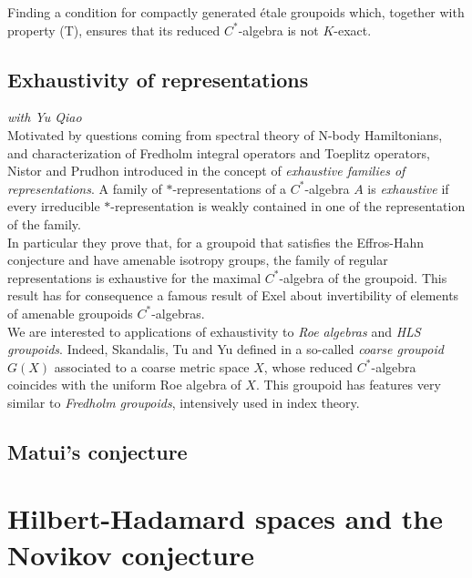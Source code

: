 \begin{project}
Finding a condition for compactly generated \'etale groupoids which, together with property (T), ensures that its reduced $C^*$-algebra is not $K$-exact. 
\end{project}

\subsection*{Exhaustivity of representations}

\textit{with Yu Qiao}\\

Motivated by questions coming from spectral theory of N-body Hamiltonians, and characterization of Fredholm integral operators and Toeplitz operators, Nistor and Prudhon introduced in \cite{NistorPrudhon} the concept of \textit{exhaustive families of representations}. A family of $*$-representations of a $C^*$-algebra $A$ is \textit{exhaustive} if every irreducible $*$-representation is weakly contained in one of the representation of the family.\\

In particular they prove that, for a groupoid that satisfies the Effros-Hahn conjecture and have amenable isotropy groups, the family of regular representations is exhaustive for the maximal $C^*$-algebra of the groupoid. This result has for consequence a famous result of Exel \cite{exel2014invertibility} about invertibility of elements of amenable groupoids $C^*$-algebras.\\

We are interested to applications of exhaustivity to \textit{Roe algebras} and \textit{HLS groupoids}. Indeed, Skandalis, Tu and Yu defined in \cite{SkTuYu} a so-called \textit{coarse groupoid} $G(X)$ associated to a coarse metric space $X$, whose reduced $C^*$-algebra coincides with the uniform Roe algebra of $X$. This groupoid has features very similar to \textit{Fredholm groupoids}, intensively used in index theory.  
 
\subsection*{Matui's conjecture}


\section{Hilbert-Hadamard spaces and the Novikov conjecture}


